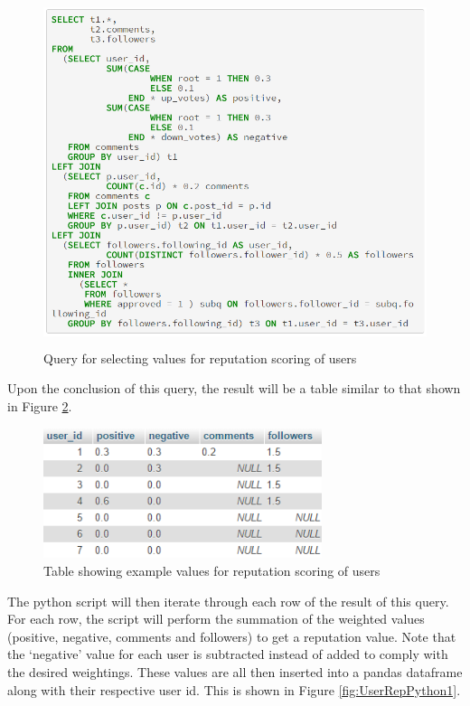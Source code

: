 \begin{figure}[H]
\centering
\includegraphics[height=4in]{Images/Implementation/UserRepQuery}
\caption{Query for selecting values for reputation scoring of users}
\label{fig:UserRepQuery}
\end{figure}

Upon the conclusion of this query, the result will be a table similar to that shown in Figure \ref{fig:UserRepTable}.

\begin{figure}[H]
\centering
\includegraphics[height=1.5in]{Images/Implementation/UserRepTable}
\caption{Table showing example values for reputation scoring of users}
\label{fig:UserRepTable}
\end{figure}

The python script will then iterate through each row of the result of this query. For each row, the script will perform the summation of the weighted values (positive, negative, comments and followers) to get a reputation value. Note that the `negative' value for each user is subtracted instead of added to comply with the desired weightings. These values are all then inserted into a pandas dataframe \cite{Pandas} along with their respective user id. This is shown in Figure \ref{fig:UserRepPython1}.


